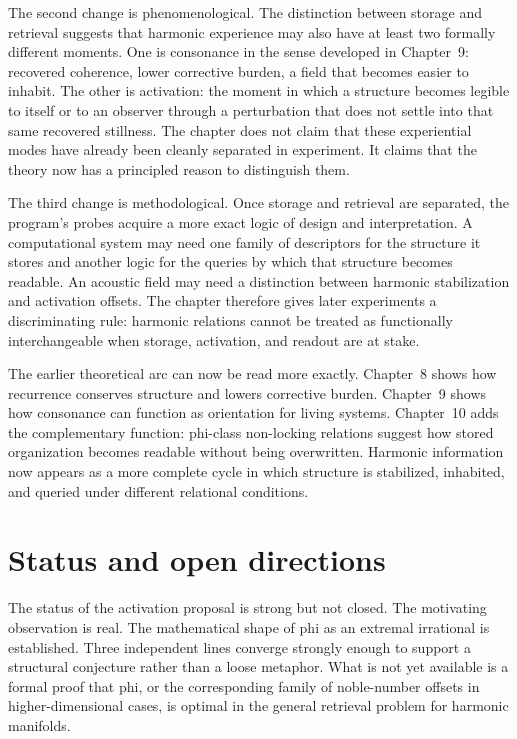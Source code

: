 The second change is phenomenological. The distinction between storage and retrieval suggests that harmonic experience may also have at least two formally different moments. One is consonance in the sense developed in Chapter~9: recovered coherence, lower corrective burden, a field that becomes easier to inhabit. The other is activation: the moment in which a structure becomes legible to itself or to an observer through a perturbation that does not settle into that same recovered stillness. The chapter does not claim that these experiential modes have already been cleanly separated in experiment. It claims that the theory now has a principled reason to distinguish them.

The third change is methodological. Once storage and retrieval are separated, the program's probes acquire a more exact logic of design and interpretation. A computational system may need one family of descriptors for the structure it stores and another logic for the queries by which that structure becomes readable. An acoustic field may need a distinction between harmonic stabilization and activation offsets. The chapter therefore gives later experiments a discriminating rule: harmonic relations cannot be treated as functionally interchangeable when storage, activation, and readout are at stake.

The earlier theoretical arc can now be read more exactly. Chapter~8 shows how recurrence conserves structure and lowers corrective burden. Chapter~9 shows how consonance can function as orientation for living systems. Chapter~10 adds the complementary function: phi-class non-locking relations suggest how stored organization becomes readable without being overwritten. Harmonic information now appears as a more complete cycle in which structure is stabilized, inhabited, and queried under different relational conditions.

\section{Status and open directions}

The status of the activation proposal is strong but not closed. The motivating observation is real. The mathematical shape of phi as an extremal irrational is established. Three independent lines converge strongly enough to support a structural conjecture rather than a loose metaphor. What is not yet available is a formal proof that phi, or the corresponding family of noble-number offsets in higher-dimensional cases, is optimal in the general retrieval problem for harmonic manifolds.

